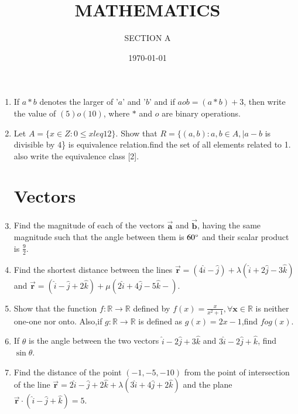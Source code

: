 \documentclass[10pt,-letter paper]{article}
\title{MATHEMATICS}
\author{SECTION A}
\date{\today}
\providecommand{\brak}[1]{\ensuremath{\left(#1\right)}}
\begin{document}
\maketitle

\begin{enumerate}
\section{Algebra}
  \item  If $a*b$ denotes the larger of '$a$' and '$b$' and if $a o b = \brak{a * b} + 3$, then write the value of $\brak{5} o \brak{10}$, where $*$ and $o$ are binary operations.
 \item Let $A=\{x \in Z : 0 \leq x leq 12\}$. Show that $R=\{\brak{a,b}: a,b \in A,\vert{a-b}$ is divisible by $4$\} is equivalence relation.find the set of all elements related to 1. also write the equivalence class [2].
 \section{Vectors}

  \item Find the magnitude of each of the vectors $\overrightarrow{\mathbf{a}}$ and $\overrightarrow{\mathbf{b}}$, having the same magnitude such that the angle between them is ${60\degree}$ and their scalar product is $\frac{9}{2}$.
 
 \item Find the shortest distance between the lines $\overrightarrow{\mathbf{r}}=\brak{4\hat{i}-\hat{j}}+\lambda\brak{\hat{i}+2\hat{j}-3\hat{k}}$ and $\overrightarrow{\mathbf{r}}=\brak{\hat{i}-\hat{j}+2\hat{k}}+\mu\brak{2\hat{i}+4\hat{j}-5\hat{k}-} $.

\item Show that the function $f:\mathbb{R}\rightarrow \mathbb{R}$ defined by $f\brak{x} = \frac{x}{x^{2}+1}, \forall \mathbf{x}\in \mathbb{R}$ is neither one-one nor onto. Also,if $g:\mathbb{R} \rightarrow \mathbb{R}$ is defined as $g\brak{x}=2x-1$,find $fog\brak{x}$.

\item If $\theta$ is the angle between the two vectors $\hat{i}-2\hat{j}+3\hat{k}$ and $3\hat{i}-2\hat{j}+\hat{k}$, find $\sin\theta$.

\item  Find the distance of the point \brak{-1,-5,-10} from the point of intersection of the line $\overrightarrow{\mathbf{r}}=2\hat{i}-\hat{j}+2\hat{k} + \lambda\brak{3\hat{i}+4\hat{j}+2\hat{k}}$ and the plane $\overrightarrow{\mathbf{r}}\cdot\brak{\hat{i}-\hat{j}+\hat{k}}=5$.


\end{enumerate}
\end{document}
